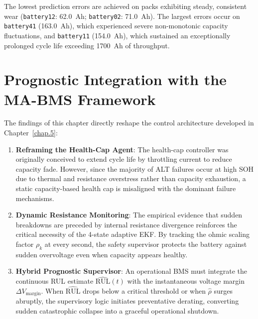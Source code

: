 The lowest prediction errors are achieved on packs exhibiting steady,
consistent wear (\texttt{battery12}: \SI{62.0}{Ah}; \texttt{battery02}:
\SI{71.0}{Ah}). The largest errors occur on \texttt{battery41}
(\SI{163.0}{Ah}), which experienced severe non-monotonic capacity
fluctuations, and \texttt{battery11} (\SI{154.0}{Ah}), which sustained
an exceptionally prolonged cycle life exceeding \SI{1700}{Ah} of throughput.

\section{Prognostic Integration with the MA-BMS Framework}

The findings of this chapter directly reshape the control architecture
developed in Chapter~\ref{chap.5}:

\begin{enumerate}
  \item \textbf{Reframing the Health-Cap Agent}: The health-cap controller
  was originally conceived to extend cycle life by throttling current to
  reduce capacity fade. However, since the majority of ALT failures occur
  at high SOH due to thermal and resistance overstress rather than capacity
  exhaustion, a static capacity-based health cap is misaligned with the
  dominant failure mechanisms.
  \item \textbf{Dynamic Resistance Monitoring}: The empirical evidence that
  sudden breakdowns are preceded by internal resistance divergence reinforces
  the critical necessity of the 4-state adaptive EKF. By tracking the ohmic
  scaling factor $\rho_k$ at every second, the safety supervisor protects
  the battery against sudden overvoltage even when capacity appears healthy.
  \item \textbf{Hybrid Prognostic Supervisor}: An operational BMS must
  integrate the continuous RUL estimate $\widehat{\mathrm{RUL}}(t)$ with the
  instantaneous voltage margin $\Delta V_{\mathrm{margin}}$. When
  $\widehat{\mathrm{RUL}}$ drops below a critical threshold or when
  $\hat{\rho}$ surges abruptly, the supervisory logic initiates
  preventative derating, converting sudden catastrophic collapse into a
  graceful operational shutdown.
\end{enumerate}
